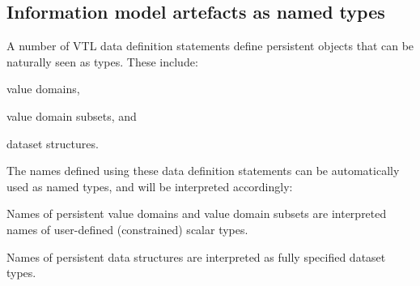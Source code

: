 \documentclass[droidmono,libertine,twoside,user,unofficial]{ecarticle}
\def\<#1>{\synt{#1}}
\begin{document}

\subsection{Information model artefacts as named types}
\label{sec:inform-model-artef}

A number of VTL data definition statements define persistent objects
that can be naturally seen as types.  These include:
\begin{compactitem}
\item value domains,
\item value domain subsets, and
\item dataset structures.
\end{compactitem}

The names defined using these data definition statements can be
automatically used as named types, and will be interpreted
accordingly:
\begin{compactitem}
\item Names of persistent value domains and value domain subsets are
  interpreted names of user-defined (constrained) scalar types.
\item Names of persistent data structures are interpreted as fully
  specified dataset types.
\end{compactitem}






\end{document}
